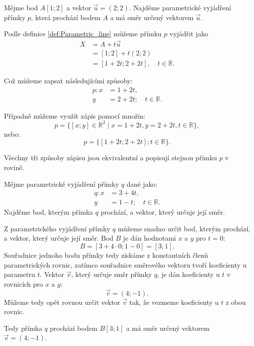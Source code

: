\begin{example}
    Mějme bod $A[1; 2]$ a vektor $\vec{u} = (2; 2)$.
    Najděme parametrické vyjádření přímky $p$, která prochází bodem $A$ a má směr určený vektorem $\vec{u}$.

    Podle definice \ref{def:Parametric_line} můžeme přímku $p$ vyjádřit jako
    \begin{align*}
        X   &= A + t\vec{u} \\
            &= [1; 2] + t(2; 2) \\
            &= [1 + 2t; 2 + 2t], \quad t \in \mathbb{R}.
    \end{align*}

    Což můžeme zapsat následujícími způsoby:
    \begin{align*}
        p:  x &= 1 + 2t, \\
            y &= 2 + 2t; \quad t \in \mathbb{R}.
    \end{align*}

    Případně můžeme využít zápis pomocí množin:
    \[
        p = \{ [x; y] \in \mathbb{R}^2 \mid x = 1 + 2t, y = 2 + 2t, t \in \mathbb{R} \},
    \]
    nebo:
    \[
        p = \{ [1 + 2t; 2 + 2t] ; t \in \mathbb{R} \}.
    \]

    Všechny tři způsoby zápisu jsou ekvivalentní a popisují stejnou přímku $p$ v rovině.
\end{example}

\begin{example}
    Mějme parametrické vyjádření přímky $q$ dané jako:
    \begin{align*}
        q:  x &= 3 + 4t, \\
            y &= 1 - t; \quad t \in \mathbb{R}.
    \end{align*}
    Najděme bod, kterým přímka $q$ prochází, a vektor, který určuje její směr.

    Z parametrického vyjádření přímky $q$ můžeme snadno určit bod, kterým prochází, a vektor, který určuje její směr.
    Bod $B$ je dán hodnotami $x$ a $y$ pro $t=0$:
    \[
        B = [3 + 4 \cdot 0; 1 - 0] = [3; 1].
    \]
    Souřadnice jednoho bodu přímky tedy získáme z konstantních členů parametrických rovnic, zatímco souřadnice směrového vektoru tvoří koeficienty u parametru $t$.
    Vektor $\vec{v}$, který určuje směr přímky $q$, je dán koeficienty u $t$ v rovnicích pro $x$ a $y$:
    \[
        \vec{v} = (4; -1).
    \]
    Můžeme tedy opět rovnou určit vektor $\vec{v}$ tak, že vezmeme koeficienty u $t$ z obou rovnic.
    
    Tedy přímka $q$ prochází bodem $B[3; 1]$ a má směr určený vektorem $\vec{v} = (4; -1)$.
\end{example}

